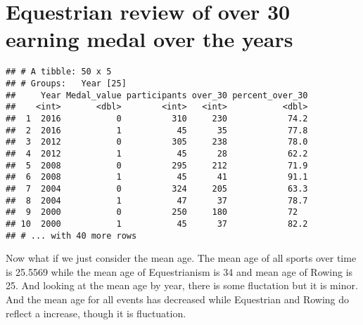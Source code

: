\documentclass[]{article}
\newenvironment{Shaded}{\begin{snugshade}}{\end{snugshade}}
\newcommand{\KeywordTok}[1]{\textcolor[rgb]{0.13,0.29,0.53}{\textbf{#1}}}
\newcommand{\DataTypeTok}[1]{\textcolor[rgb]{0.13,0.29,0.53}{#1}}
\newcommand{\DecValTok}[1]{\textcolor[rgb]{0.00,0.00,0.81}{#1}}
\newcommand{\StringTok}[1]{\textcolor[rgb]{0.31,0.60,0.02}{#1}}
\newcommand{\OperatorTok}[1]{\textcolor[rgb]{0.81,0.36,0.00}{\textbf{#1}}}
\newcommand{\NormalTok}[1]{#1}
\begin{document}
\section{Equestrian review of over 30 earning medal over the
years}\label{equestrian-review-of-over-30-earning-medal-over-the-years}

\begin{Shaded}
\end{Shaded}

\begin{verbatim}
## # A tibble: 50 x 5
## # Groups:   Year [25]
##     Year Medal_value participants over_30 percent_over_30
##    <int>       <dbl>        <int>   <int>           <dbl>
##  1  2016           0          310     230            74.2
##  2  2016           1           45      35            77.8
##  3  2012           0          305     238            78.0
##  4  2012           1           45      28            62.2
##  5  2008           0          295     212            71.9
##  6  2008           1           45      41            91.1
##  7  2004           0          324     205            63.3
##  8  2004           1           47      37            78.7
##  9  2000           0          250     180            72  
## 10  2000           1           45      37            82.2
## # ... with 40 more rows
\end{verbatim}

Now what if we just consider the mean age. The mean age of all sports
over time is 25.5569 while the mean age of Equestrianism is 34 and mean
age of Rowing is 25. And looking at the mean age by year, there is some
fluctation but it is minor. And the mean age for all events has
decreased while Equestrian and Rowing do reflect a increase, though it
is fluctuation.
\end{document}
